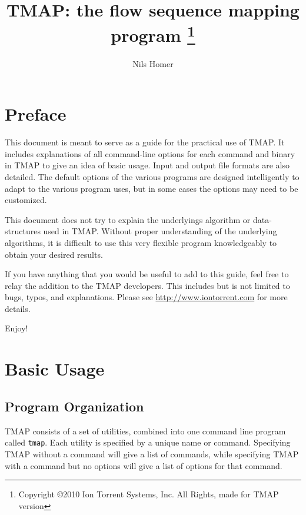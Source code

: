 \documentclass[a4paper,12pt]{book}
\author{Nils Homer}
\date{}
\title{TMAP: the flow sequence mapping program
\thanks{Copyright \copyright 2010 Ion Torrent Systems, Inc. All Rights, made for TMAP version \Version}
}
\newcommand{\TT}[1]{{\tt #1}} %
\begin{document}
\frontmatter

\maketitle

\tableofcontents
{}


\chapter{Preface}
This document is meant to serve as a guide for the practical use of TMAP.
It includes explanations of all command-line options for each command and binary in TMAP to give an idea of basic usage.
Input and output file formats are also detailed.
The default options of the various programs are designed intelligently to adapt to the various program uses, but in some cases the options may need to be customized.

This document does not try to explain the underlyings algorithm or data-structures used in TMAP.
Without proper understanding of the underlying algorithms, it is difficult to use this very flexible program knowledgeably to obtain your desired results.

If you have anything that you would be useful to add to this guide, feel free to relay the addition to the TMAP developers.
This includes but is not limited to bugs, typos, and explanations.
Please see \url{http://www.iontorrent.com} for more details.

Enjoy!

\mainmatter

\chapter{Basic Usage}

\section{Program Organization}
TMAP consists of a set of utilities, combined into one command line program called \TT{tmap}.  
Each utility is specified by a unique name or command.
Specifying TMAP without a command will give a list of commands, while specifying TMAP with a command but no options will give a list of options for that command.
\end{document}
